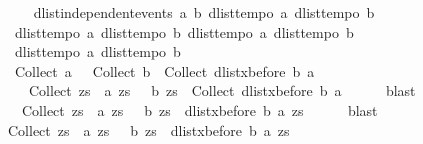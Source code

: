 \begin{isabellebody}
%
\isadelimproof
%
\endisadelimproof
%
\isatagproof
{}\isamarkupfalse%
{\isacharminus}\isanewline
\ \ \isamarkupfalse%
\ {}{\isacharcolon}\ {\isachardoublequoteopen}dlist{\isacharunderscore}independent{\isacharunderscore}events\ a\ b{\isachardoublequoteclose}\ {\isachardoublequoteopen}dlist{\isacharunderscore}tempo{}\ a{\isachardoublequoteclose}\ {\isachardoublequoteopen}dlist{\isacharunderscore}tempo{}\ b{\isachardoublequoteclose}\ \isanewline
\ \ {\isachardoublequoteopen}dlist{\isacharunderscore}tempo{}\ a{\isachardoublequoteclose}\ {\isachardoublequoteopen}dlist{\isacharunderscore}tempo{}\ b{\isachardoublequoteclose}\ {\isachardoublequoteopen}dlist{\isacharunderscore}tempo{}\ a{\isachardoublequoteclose}\ {\isachardoublequoteopen}dlist{\isacharunderscore}tempo{}\ b{\isachardoublequoteclose}\ \isanewline
\ \ {\isachardoublequoteopen}dlist{\isacharunderscore}tempo{}\ a{\isachardoublequoteclose}\ {\isachardoublequoteopen}dlist{\isacharunderscore}tempo{}\ b{\isachardoublequoteclose}\isanewline
\ \ \isamarkupfalse%
\ {\isachardoublequoteopen}{\isacharparenleft}{\isacharparenleft}{\isacharminus}\ Collect\ a{\isacharparenright}\ {\isasymunion}\ {\isacharparenleft}{\isacharminus}\ Collect\ b{\isacharparenright}\ {\isasymunion}\ Collect\ {\isacharparenleft}dlist{\isacharunderscore}xbefore\ b\ a{\isacharparenright}{\isacharparenright}\ {\isacharequal}\isanewline
\ \ \ \ {\isacharparenleft}{\isacharparenleft}Collect\ {\isacharparenleft}{\isasymlambda}zs{\isachardot}\ {\isasymnot}\ a\ zs\ {\isasymor}\ {\isasymnot}\ b\ zs{\isacharparenright}{\isacharparenright}\ {\isasymunion}\ Collect\ {\isacharparenleft}dlist{\isacharunderscore}xbefore\ b\ a{\isacharparenright}{\isacharparenright}{\isachardoublequoteclose}\isanewline
\ \ \ \ \isamarkupfalse%
\ blast\isanewline
\ \ \isamarkupfalse%
\ \isamarkupfalse%
\ {\isachardoublequoteopen}{\isachardot}{\isachardot}{\isachardot}\ {\isacharequal}\ {\isacharparenleft}Collect\ {\isacharparenleft}{\isasymlambda}zs{\isachardot}\ {\isasymnot}\ a\ zs\ {\isasymor}\ {\isasymnot}\ b\ zs\ {\isasymor}\ dlist{\isacharunderscore}xbefore\ b\ a\ zs{\isacharparenright}{\isacharparenright}{\isachardoublequoteclose}\isanewline
\ \ \ \ \isamarkupfalse%
\ blast\isanewline
\ \ \isamarkupfalse%
\ {\isachardoublequoteopen}Collect\ {\isacharparenleft}{\isasymlambda}zs{\isachardot}\ {\isacharparenleft}{\isasymnot}\ a\ zs{\isacharparenright}\ {\isasymor}\ {\isacharparenleft}{\isasymnot}\ b\ zs{\isacharparenright}\ {\isasymor}\ {\isacharparenleft}dlist{\isacharunderscore}xbefore\ b\ a\ zs{\isacharparenright}{\isacharparenright}\ {\isacharequal}\isanewline

\end{isabellebody}

